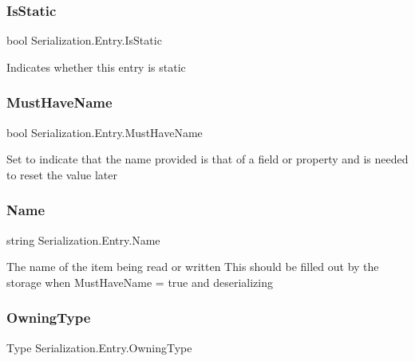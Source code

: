 \subsubsection{\texorpdfstring{Is\+Static}{IsStatic}}
{\footnotesize\ttfamily bool Serialization.\+Entry.\+Is\+Static}



Indicates whether this entry is static 

\mbox{\label{class_serialization_1_1_entry_a09a13ff1f6b299c4728a734b307de2b5}} 
\subsubsection{\texorpdfstring{Must\+Have\+Name}{MustHaveName}}
{\footnotesize\ttfamily bool Serialization.\+Entry.\+Must\+Have\+Name}



Set to indicate that the name provided is that of a field or property and is needed to reset the value later 

\mbox{\label{class_serialization_1_1_entry_a27386eb83718b39bfc36c67585639247}} 
\subsubsection{\texorpdfstring{Name}{Name}}
{\footnotesize\ttfamily string Serialization.\+Entry.\+Name}



The name of the item being read or written This should be filled out by the storage when Must\+Have\+Name = true and deserializing 

\mbox{\label{class_serialization_1_1_entry_a1fd7fb4ac04afda6919998688f741e33}} 
\subsubsection{\texorpdfstring{Owning\+Type}{OwningType}}
{\footnotesize\ttfamily Type Serialization.\+Entry.\+Owning\+Type}



